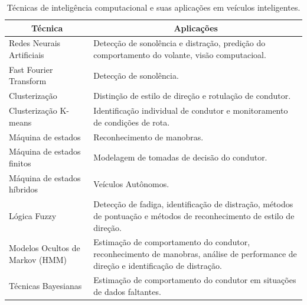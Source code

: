 \begin{table}[!htb]
	\centering
	\caption{Técnicas de inteligência computacional e suas aplicações em veículos inteligentes. }
	\label{tecs1}
	\begin{tabular}{p{55mm}|p{95mm}}
		\hline
		\multicolumn{1}{c|}{\textbf{Técnica}} & \multicolumn{1}{|c}{\textbf{Aplicações}}                                                                                            \\ \hline
		Redes Neurais Artificiais              & Detecção de sonolência e distração, predição do comportamento do volante, visão computacioal.                                       \\ \hline
		Fast Fourier Transform                 & Detecção de sonolência.                                                                                                             \\ \hline
		Clusterização                          & Distinção de estilo de direção e rotulação de condutor.                                                                             \\ \hline
		Clusterização K-means                  & Identificação individual de condutor e monitoramento de condições de rota.                                                          \\ \hline
		Máquina de estados                     & Reconhecimento de manobras.                                                                                                         \\ \hline
		Máquina de estados finitos             & Modelagem de tomadas de decisão do condutor.                                                                                        \\ \hline
		Máquina de estados híbridos            & Veículos Autônomos.                                                                                                                 \\ \hline
		Lógica Fuzzy                           & Detecção de fadiga, identificação de distração, métodos de pontuação e métodos de reconhecimento de estilo de direção.              \\ \hline
		Modelos Ocultos de Markov (HMM)        & Estimação de comportamento do condutor, reconhecimento de manobras, análise de performance de direção e identificação de distração. \\ \hline
		Técnicas Bayesianas                    & Estimação de comportamento do condutor em situações de dados faltantes.                                                             \\ \hline

\end{tabular}
\end{table}
